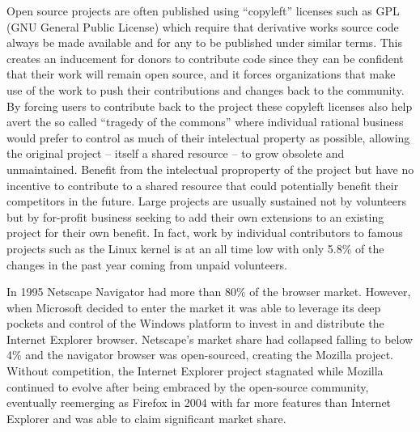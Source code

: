 Open source projects are often published using ``copyleft'' licenses such as GPL (GNU General Public License) which require that derivative works source code always be made available and for any to be published under similar terms.
This creates an inducement for donors to contribute code since they can be confident that their work will remain open source, and it forces organizations that make use of the work to push their contributions and changes back to the community.\autocite[198]{buxmann2012software}
By forcing users to contribute back to the project these copyleft licenses also help avert the so called ``tragedy of the commons'' where individual rational business would prefer to control as much of their intelectual property as possible, allowing the original project -- itself a shared resource -- to grow obsolete and unmaintained.
Benefit from the intelectual proproperty of the project but have no incentive to contribute to a shared resource that could potentially benefit their competitors in the future.
Large projects are usually sustained not by volunteers but by for-profit business seeking to add their own extensions to an existing project for their own benefit.
In fact, work by individual contributors to famous projects such as the Linux kernel is at an all time low with only 5.8\% of the changes in the past year coming from unpaid volunteers.\autocite[]{KernelDevelopment2015}


In 1995 Netscape Navigator had more than 80\% of the browser market. However, when Microsoft decided to enter the market it was able to leverage its deep pockets and control of the Windows platform to invest in and distribute the Internet Explorer browser.\autocite[27]{buxmann2012software}
Netscape's market share had collapsed falling to below 4\% and the navigator browser was open-sourced, creating the Mozilla project.\autocite[27]{buxmann2012software}
Without competition, the Internet Explorer project stagnated while Mozilla continued to evolve after being embraced by the open-source community, eventually reemerging as Firefox in 2004 with far more features than Internet Explorer and was able to claim significant market share.\autocite[27]{buxmann2012software}


